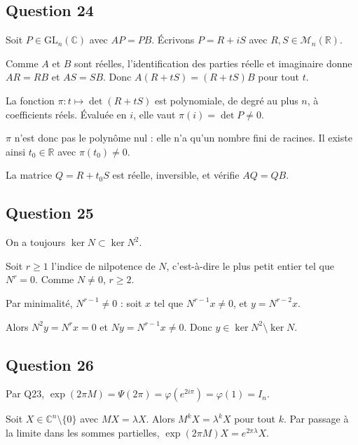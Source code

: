 \documentclass[11pt,a4paper]{article}
\newcommand{\equationajustee}[1]{%
  \sbox{\boiteequation}{$\displaystyle #1$}%
  \ifdim\wd\boiteequation>\linewidth
    \[\resizebox{\linewidth}{!}{\usebox{\boiteequation}}\]%
  \else
    \[#1\]%
  \fi}
\begin{document}
\hypertarget{question-24}{%
\subsection{Question 24}\label{question-24}}

Soit \(P\in{\mathrm{GL}}_n(\mathbb C)\) avec \(AP=PB\). Écrivons \(P=R+iS\) avec \(R,S\in\mathcal M_n(\mathbb R)\).

Comme \(A\) et \(B\) sont réelles, l'identification des parties réelle et imaginaire donne \(AR=RB\) et \(AS=SB\). Donc \(A(R+tS)=(R+tS)B\) pour tout \(t\).

La fonction \(\pi:t\mapsto\det(R+tS)\) est polynomiale, de degré au plus \(n\), à coefficients réels. Évaluée en \(i\), elle vaut \(\pi(i)=\det P\ne0\).

\(\pi\) n'est donc pas le polynôme nul : elle n'a qu'un nombre fini de racines. Il existe ainsi \(t_0\in\mathbb R\) avec \(\pi(t_0)\ne0\).

La matrice \(Q=R+t_0S\) est réelle, inversible, et vérifie \(AQ=QB\).

\equationajustee{\boxed{A=QBQ^{-1}\ \text{avec}\ Q\in{\mathrm{GL}}_n(\mathbb R).}}

\hypertarget{question-25}{%
\subsection{Question 25}\label{question-25}}

On a toujours \(\ker N\subset\ker N^2\).

Soit \(r\ge1\) l'indice de nilpotence de \(N\), c'est-à-dire le plus petit entier tel que \(N^r=0\). Comme \(N\ne0\), \(r\ge2\).

Par minimalité, \(N^{r-1}\ne0\) : soit \(x\) tel que \(N^{r-1}x\ne0\), et \(y=N^{r-2}x\).

Alors \(N^2y=N^rx=0\) et \(Ny=N^{r-1}x\ne0\). Donc \(y\in\ker N^2\setminus\ker N\).

\equationajustee{\boxed{\ker N\ne\ker N^2}}

\hypertarget{question-26}{%
\subsection{Question 26}\label{question-26}}

Par Q23, \(\exp(2\pi M)=\Psi(2\pi)=\varphi(e^{2i\pi})=\varphi(1)=I_n\).

Soit \(X\in\mathbb C^n\setminus\{0\}\) avec \(MX=\lambda X\). Alors \(M^kX=\lambda^kX\) pour tout \(k\). Par passage à la limite dans les sommes partielles, \(\exp(2\pi M)X=e^{2\pi\lambda}X\).
\end{document}
